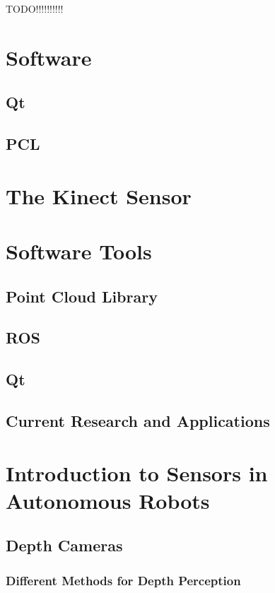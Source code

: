 TODO!!!!!!!!!!

\section{Software}

\subsection{Qt}

\subsection{PCL}

\section{The Kinect Sensor}

\section{Software Tools}

\subsection{Point Cloud Library}

\subsection{ROS}

\subsection{Qt}


\subsection{Current Research and Applications}

\section{Introduction to Sensors in Autonomous Robots}

\subsection{Depth Cameras}

\subsubsection{Different Methods for Depth Perception}

